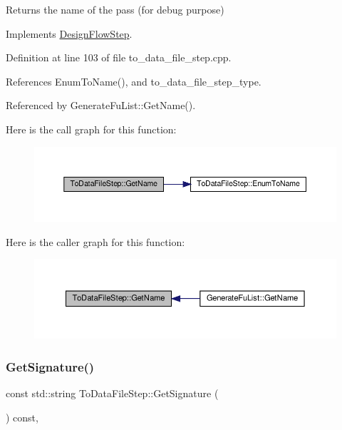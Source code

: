 \begin{DoxyReturn}{Returns}
the name of the pass (for debug purpose) 
\end{DoxyReturn}


Implements \hyperlink{classDesignFlowStep_a01e5ebfab88db3b3b7f832f80075fad8}{Design\+Flow\+Step}.



Definition at line 103 of file to\+\_\+data\+\_\+file\+\_\+step.\+cpp.



References Enum\+To\+Name(), and to\+\_\+data\+\_\+file\+\_\+step\+\_\+type.



Referenced by Generate\+Fu\+List\+::\+Get\+Name().

Here is the call graph for this function\+:
\nopagebreak
\begin{figure}[H]
\begin{center}
\leavevmode
\includegraphics[width=350pt]{d6/d54/classToDataFileStep_ada4a3271187ee310379405eaaefc24e1_cgraph}
\end{center}
\end{figure}
Here is the caller graph for this function\+:
\nopagebreak
\begin{figure}[H]
\begin{center}
\leavevmode
\includegraphics[width=350pt]{d6/d54/classToDataFileStep_ada4a3271187ee310379405eaaefc24e1_icgraph}
\end{center}
\end{figure}
\mbox{\label{classToDataFileStep_ad4d235d11fd907c9d593f73e55609022}} 
\subsubsection{\texorpdfstring{Get\+Signature()}{GetSignature()}}
{\footnotesize\ttfamily const std\+::string To\+Data\+File\+Step\+::\+Get\+Signature (\begin{DoxyParamCaption}{ }\end{DoxyParamCaption}) const\hspace{0.3cm}{\ttfamily [override]}, {\ttfamily [virtual]}}



